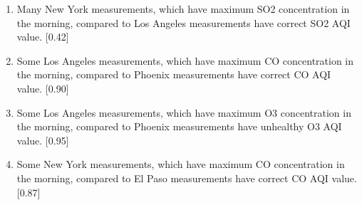 \documentclass{classrep}
\begin{document}
{{\begin{enumerate}
                \item Many New York measurements, which have maximum SO2 concentration in the morning, compared to Los Angeles measurements have correct SO2 AQI value. [0.42]
                \item Some Los Angeles measurements, which have maximum CO concentration in the morning, compared to Phoenix measurements have correct CO AQI value. [0.90]
                \item Some Los Angeles measurements, which have maximum O3 concentration in the morning, compared to Phoenix measurements have unhealthy O3 AQI value. [0.95]
                \item Some New York measurements, which have maximum CO concentration in the morning, compared to El Paso measurements have correct CO AQI value. [0.87]
            \end{enumerate}
        }
    }
\end{document}
